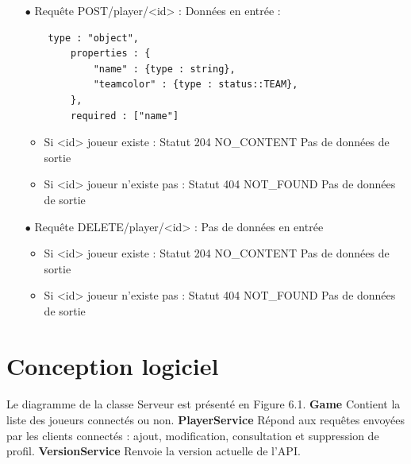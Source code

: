 \documentclass[12pt]{report}
\begin{document}
\begin{itemize}
    \bigskip
    \item[$\bullet$] Requête POST/player/<id> :
    \newline Données en entrée :
    \begin{verbatim} 
    type : "object",
        properties : {
            "name" : {type : string},
            "teamcolor" : {type : status::TEAM},
        },
        required : ["name"] \end{verbatim}
    \begin{itemize}
        \item Si <id> joueur existe : Statut 204 NO\_CONTENT
        \newline Pas de données de sortie
        \item Si <id> joueur n'existe pas : Statut 404 NOT\_FOUND
        \newline Pas de données de sortie
    \end{itemize}
    
    \bigskip
    \item[$\bullet$] Requête DELETE/player/<id> : Pas de données en entrée
    \begin{itemize}
        \item Si <id> joueur existe : Statut 204 NO\_CONTENT
        \newline Pas de données de sortie
        \item Si <id> joueur n'existe pas : Statut 404 NOT\_FOUND
        \newline Pas de données de sortie
    \end{itemize}
\end{itemize}

\section{Conception logiciel}
\paragraph{}Le diagramme de la classe Serveur est présenté en Figure 6.1.
\newline
\paragraphe{}
\textbf{Game} Contient la liste des joueurs connectés ou non.\newline
\textbf{PlayerService} Répond aux requêtes envoyées par les clients connectés : ajout, modification, consultation et suppression de profil.\newline
\textbf{VersionService} Renvoie la version actuelle de l'API.
\end{document}
